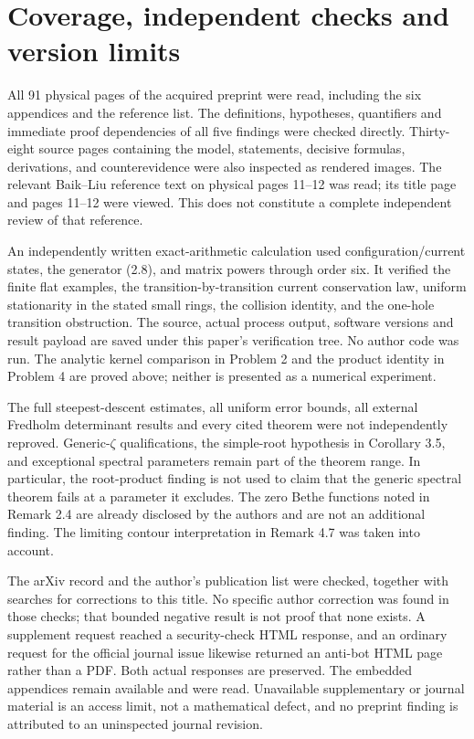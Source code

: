 \documentclass[10pt]{article}
\begin{document}
\section*{Coverage, independent checks and version limits}
All 91 physical pages of the acquired preprint were read, including the six appendices and the reference list. The definitions, hypotheses, quantifiers and immediate proof dependencies of all five findings were checked directly. Thirty-eight source pages containing the model, statements, decisive formulas, derivations, and counterevidence were also inspected as rendered images. The relevant Baik–Liu reference text on physical pages 11–12 was read; its title page and pages 11–12 were viewed. This does not constitute a complete independent review of that reference.\par
An independently written exact-arithmetic calculation used configuration/current states, the generator (2.8), and matrix powers through order six. It verified the finite flat examples, the transition-by-transition current conservation law, uniform stationarity in the stated small rings, the collision identity, and the one-hole transition obstruction. The source, actual process output, software versions and result payload are saved under this paper’s verification tree. No author code was run. The analytic kernel comparison in Problem 2 and the product identity in Problem 4 are proved above; neither is presented as a numerical experiment.\par
The full steepest-descent estimates, all uniform error bounds, all external Fredholm determinant results and every cited theorem were not independently reproved. Generic-\(\zeta\) qualifications, the simple-root hypothesis in Corollary 3.5, and exceptional spectral parameters remain part of the theorem range. In particular, the root-product finding is not used to claim that the generic spectral theorem fails at a parameter it excludes. The zero Bethe functions noted in Remark 2.4 are already disclosed by the authors and are not an additional finding. The limiting contour interpretation in Remark 4.7 was taken into account.\par
The arXiv record and the author’s publication list were checked, together with searches for corrections to this title. No specific author correction was found in those checks; that bounded negative result is not proof that none exists. A supplement request reached a security-check HTML response, and an ordinary request for the official journal issue likewise returned an anti-bot HTML page rather than a PDF. Both actual responses are preserved. The embedded appendices remain available and were read. Unavailable supplementary or journal material is an access limit, not a mathematical defect, and no preprint finding is attributed to an uninspected journal revision.\par
\end{document}
